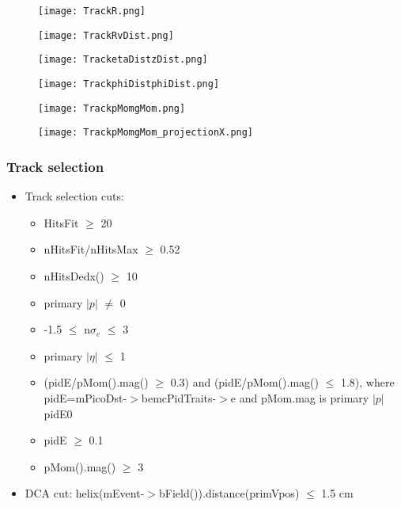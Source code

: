 \documentclass{beamer}
\begin{document}
\begin{frame}
  \begin{figure}[h!]
  \centering
  \texttt{[image: TrackR.png]}
  \end{figure}
\end{frame}

\begin{frame}
  \begin{figure}[h!]
  \centering
  \texttt{[image: TrackRvDist.png]}
  \end{figure}
\end{frame}

\begin{frame}
  \begin{figure}[h!]
  \centering
  \texttt{[image: TracketaDistzDist.png]}
  \end{figure}
\end{frame}

\begin{frame}
  \begin{figure}[h!]
  \centering
  \texttt{[image: TrackphiDistphiDist.png]}
  \end{figure}
\end{frame}

\begin{frame}
  \begin{figure}[h!]
  \centering
  \texttt{[image: TrackpMomgMom.png]}
  \end{figure}
\end{frame}

\begin{frame}
  \begin{figure}[h!]
  \centering
  \texttt{[image: TrackpMomgMom\_projectionX.png]}
  \end{figure}
\end{frame}

\begin{frame}
  \frametitle{Track selection}
  \begin{itemize}
  \item Track selection cuts:
	  \begin{itemize}
	  	\item HitsFit $\geq$ 20
	  	\item nHitsFit/nHitsMax $\geq$ 0.52
	  	\item nHitsDedx() $\geq$ 10
	  	\item primary $|p|$ $\neq$ 0
	  	\item -1.5 $\leq$ n$\sigma_e$ $\leq$ 3
	  	\item primary $|\eta|$ $\leq$ 1
	  	\item (pidE/pMom().mag() $\geq$ 0.3) and (pidE/pMom().mag() $\leq$ 1.8), where pidE=mPicoDst-$>$bemcPidTraits-$>$e and pMom.mag is primary $|p|$pidE0
	  	\item pidE $\geq$ 0.1
	  	\item pMom().mag() $\geq$ 3
	  \end{itemize}
  \item DCA cut: helix(mEvent-$>$bField()).distance(primVpos) $\leq$ 1.5 cm
	  
  \end{itemize}
\end{frame}
\end{document}
